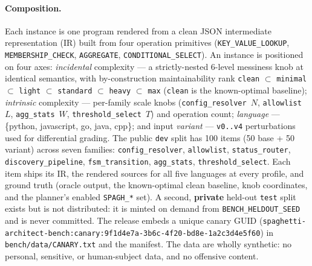 \paragraph{Composition.}
Each instance is one program rendered from a clean JSON intermediate representation
(IR) built from four operation primitives (\texttt{KEY\_VALUE\_LOOKUP},
\texttt{MEMBERSHIP\_CHECK}, \texttt{AGGREGATE}, \texttt{CONDITIONAL\_SELECT}). An
instance is positioned on four axes: \emph{incidental} complexity --- a strictly-nested
6-level messiness knob at identical semantics, with by-construction maintainability
rank \texttt{clean} $\subset$ \texttt{minimal} $\subset$ \texttt{light} $\subset$
\texttt{standard} $\subset$ \texttt{heavy} $\subset$ \texttt{max} (\texttt{clean} is
the known-optimal baseline); \emph{intrinsic} complexity --- per-family scale knobs
(\texttt{config\_resolver}~$N$, \texttt{allowlist}~$L$, \texttt{agg\_stats}~$W$,
\texttt{threshold\_select}~$T$) and operation count; \emph{language} ---
\{python, javascript, go, java, cpp\}; and input \emph{variant} ---
\texttt{v0..v4} perturbations used for differential grading. The public \texttt{dev}
split has 100 items (50 base + 50 variant) across seven families:
\texttt{config\_resolver}, \texttt{allowlist}, \texttt{status\_router},
\texttt{discovery\_pipeline}, \texttt{fsm\_transition}, \texttt{agg\_stats},
\texttt{threshold\_select}. Each item ships its IR, the rendered sources for all five
languages at every profile, and ground truth (oracle output, the known-optimal clean
baseline, knob coordinates, and the planner's enabled \texttt{SPAGH\_*} set). A second,
\textbf{private} held-out \texttt{test} split exists but is not distributed: it is
minted on demand from \texttt{BENCH\_HELDOUT\_SEED} and is never committed. The release
embeds a unique canary GUID
(\texttt{spaghetti-architect-bench:\allowbreak canary:\allowbreak 9f1d4e7a-3b6c-\allowbreak 4f20-bd8e-\allowbreak 1a2c3d4e5f60}) in
\texttt{bench/data/CANARY.txt} and the manifest. The data are wholly synthetic: no
personal, sensitive, or human-subject data, and no offensive content.

